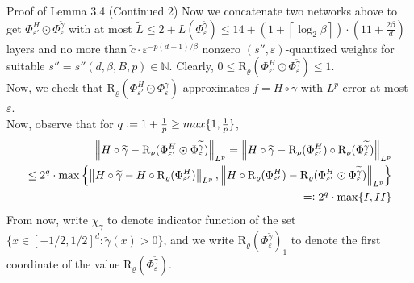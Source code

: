 \documentclass{if-beamer}
\newcommand{\defeq}{\vcentcolon=}
\newcommand{\eqdef}{=\vcentcolon}
\newcommand{\norm}[2]{\left\lVert#1\right\rVert_{#2}}
\begin{document}
\begin{frame}{Proof of Lemma 3.4 (Continued 2)}
    Now we concatenate two networks above to get $\Phi_{\varepsilon'}^H \odot \Phi_{\varepsilon}^{\widetilde{\gamma}}$ with at most $\widetilde{L} \leq 2 + L(\Phi_{\varepsilon}^{\widetilde{\gamma}}) \leq 14 + \left(1+\left\lceil\log _{2} \beta\right\rceil\right) \cdot(11+\frac{2\beta}{d})$ layers and no more than $\widetilde{c}\cdot \varepsilon^{-p(d-1)/\beta}$ nonzero $(s'',\varepsilon)$-quantized weights for suitable $s''=s''(d,\beta,B,p) \in \mathbb{N}$. Clearly, $0 \leq \mathrm{R}_{\varrho}(\Phi_{\varepsilon'}^H \odot \Phi_{\varepsilon}^{\widetilde{\gamma}}) \leq 1$.\\
    Now, we check that $\mathrm{R}_{\varrho}(\Phi_{\varepsilon'}^H \odot \Phi_{\varepsilon}^{\widetilde{\gamma}})$ approximates $f = H \circ \widetilde{\gamma}$ with $L^p$-error at most $\varepsilon$.\\
    Now, observe that for $q \defeq 1+\frac{1}{p} \geq max\{1, \frac{1}{p}\}$,
    {\small 
    \begin{align*}
        \norm{H \circ \widetilde{\gamma} - \mathrm{R}_{\varrho}(\Phi_{\varepsilon'}^H \odot \Phi_{\varepsilon}^{\widetilde{\gamma}})}{L^p} 
        = \norm{H \circ \widetilde{\gamma} - \mathrm{R}_{\varrho}(\Phi_{\varepsilon'}^H) \circ \mathrm{R}_{\varrho}(\Phi_{\varepsilon}^{\widetilde{\gamma}})}{L^p}\\
        \leq 2^q \cdot \max\left\{\norm{H \circ \widetilde{\gamma} - H \circ \mathrm{R}_{\varrho}(\Phi_{\varepsilon'}^H)}{L^p}, \norm{H \circ \mathrm{R}_{\varrho}(\Phi_{\varepsilon'}^H) -\mathrm{R}_{\varrho}(\Phi_{\varepsilon'}^H \odot \Phi_{\varepsilon}^{\widetilde{\gamma}}) }{L^p} \right\} \\
        \eqdef 2^q \cdot \max \{I,II \}
    \end{align*}}%
    From now, write $\chi_{\widetilde{\gamma}}$ to denote indicator function of the set $\{x \in [-1/2, 1/2]^d: \widetilde{\gamma}(x)>0 \}$, and we write $\mathrm{R}_{\varrho}(\Phi_{\varepsilon}^{\widetilde{\gamma}})_1$ to denote the first coordinate of the value $\mathrm{R}_{\varrho}(\Phi_{\varepsilon}^{\widetilde{\gamma}})$.
\end{frame}
\end{document}
